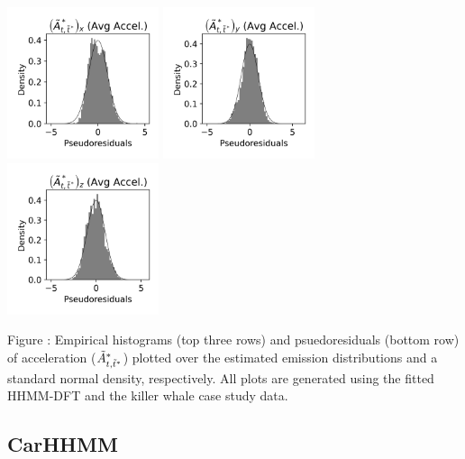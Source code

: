\documentclass{article}
\begin{document}
\begin{center}
        \includegraphics[width=1.75in]{../Plots/2019/20190902-182840-CATs_OB_1_0_267_HHMM_pseudresids_Ax.png}
        \includegraphics[width=1.75in]{../Plots/2019/20190902-182840-CATs_OB_1_0_267_HHMM_pseudresids_Ay.png}
        \includegraphics[width=1.75in]{../Plots/2019/20190902-182840-CATs_OB_1_0_267_HHMM_pseudresids_Az.png}
        \end{center}
        
        \noindent Figure : Empirical histograms (top three rows) and psuedoresiduals (bottom row) of acceleration ($\tilde{A}^*_{t,\tilde t^*}$) plotted over the estimated emission distributions and a standard normal density, respectively. All plots are generated using the fitted HHMM-DFT and the killer whale case study data.
        \addtocounter{fignum}{1}
        
        \newpage
        
        \subsection{CarHHMM}
        
\end{document}
